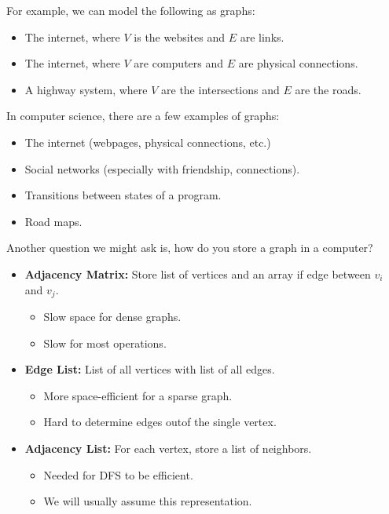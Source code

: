 \documentclass[letterpaper]{article}
\begin{document}
For example, we can model the following as graphs: 
\begin{itemize}
    \item The internet, where $V$ is the websites and $E$ are links. 
    \item The internet, where $V$ are computers and $E$ are physical connections. 
    \item A highway system, where $V$ are the intersections and $E$ are the roads. 
\end{itemize}
In computer science, there are a few examples of graphs: 
\begin{itemize}
    \item The internet (webpages, physical connections, etc.)
    \item Social networks (especially with friendship, connections).
    \item Transitions between states of a program. 
    \item Road maps. 
\end{itemize}
Another question we might ask is, how do you store a graph in a computer?
\begin{itemize}
    \item \textbf{Adjacency Matrix:} Store list of vertices and an array  if edge between $v_i$ and $v_j$.
    \begin{itemize}
        \item Slow space for dense graphs.
        \item Slow for most operations.
    \end{itemize}

    \item \textbf{Edge List:} List of all vertices with list of all edges. 
    \begin{itemize}
        \item More space-efficient for a sparse graph. 
        \item Hard to determine edges outof the single vertex.
    \end{itemize}

    \item \textbf{Adjacency List:} For each vertex, store a list of neighbors.
    \begin{itemize}
        \item Needed for DFS to be efficient. 
        \item We will usually assume this representation.
    \end{itemize}
\end{itemize}
\end{document}
